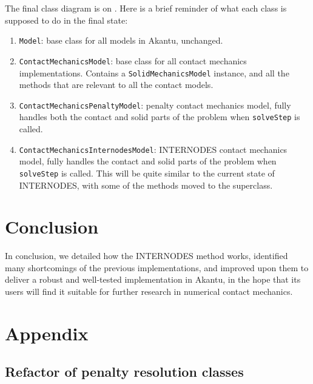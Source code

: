 \documentclass[11pt, a4paper]{article}
\begin{document}
The final class diagram is on . Here is a brief reminder of what each class is supposed to do in the final state:
\begin{enumerate}
    \item \texttt{Model}: base class for all models in Akantu, unchanged.
    \item \texttt{ContactMechanicsModel}: base class for all contact mechanics implementations. Contains a \texttt{SolidMechanicsModel} instance, and all the methods that are relevant to all the contact models.
    \item \texttt{ContactMechanicsPenaltyModel}: penalty contact mechanics model, fully handles both the contact and solid parts of the problem when \texttt{solveStep} is called.
    \item \texttt{ContactMechanicsInternodesModel}: INTERNODES contact mechanics model, fully handles the contact and solid parts of the problem when \texttt{solveStep} is called. This will be quite similar to the current state of INTERNODES, with some of the methods moved to the superclass.
\end{enumerate}




\clearpage
\section{Conclusion}
\label{sec:conclusion}
In conclusion, we detailed how the INTERNODES method works, identified many shortcomings of the previous implementations, and improved upon them to deliver a robust and well-tested implementation in Akantu, in the hope that its users will find it suitable for further research in numerical contact mechanics.

\clearpage


\clearpage
\section*{Appendix}

\subsection*{Refactor of penalty resolution classes}
\end{document}
